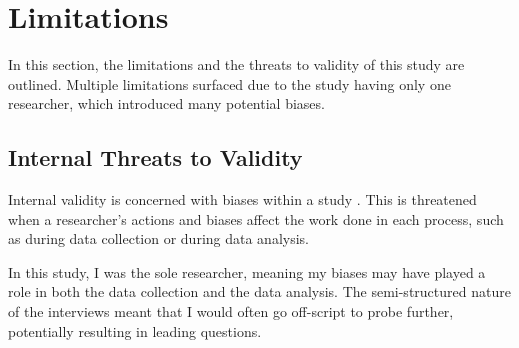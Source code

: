 


\section{Limitations}
In this section, the limitations and the threats to validity of this study are outlined. Multiple limitations surfaced due to the study having only one researcher, which introduced many potential biases.

\subsection{Internal Threats to Validity}
Internal validity is concerned with biases within a study \cite{creswell2013research}. This is threatened when a researcher's actions and biases affect the work done in each process, such as during data collection or during data analysis.

In this study, I was the sole researcher, meaning my biases may have played a role in both the data collection and the data analysis. The semi-structured nature of the interviews meant that I would often go off-script to probe further, potentially resulting in leading questions.

